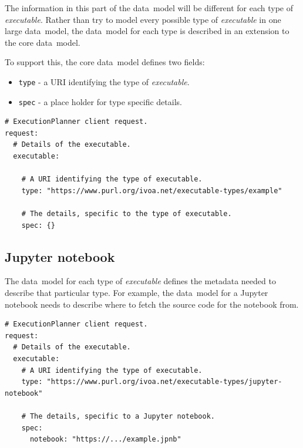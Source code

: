 \documentclass[11pt,a4paper]{ivoa}
\newcommand{\datamodel} {data~model}
\newcommand{\jupyternotebook} {Jupyter notebook}
\newcommand{\codeword}[1] {\texttt{#1}}
\newcommand{\executable} {\textit{executable}}
\begin{document}
The information in this part of the \datamodel{} will be different for each type of \executable{}.
Rather than try to model every possible type of \executable{} in one large \datamodel{},
the \datamodel{} for each type is described in an extension to the core \datamodel{}.

To support this, the core \datamodel{} defines two fields:
\begin{itemize}
  \item \codeword{type} - a URI identifying the type of \executable{}.
  \item \codeword{spec} - a place holder for type specific details.
\end{itemize}

\begin{lstlisting}[]
# ExecutionPlanner client request.
request:
  # Details of the executable.
  executable:

    # A URI identifying the type of executable.
    type: "https://www.purl.org/ivoa.net/executable-types/example"

    # The details, specific to the type of executable.
    spec: {}
\end{lstlisting}

\subsection{\jupyternotebook{}}
\label{jupyternotebook}
The \datamodel{} for each type of \executable{} defines the metadata needed to
describe that particular type.
For example, the \datamodel{} for a \jupyternotebook{} needs to describe where
to fetch the source code for the notebook from.

\begin{lstlisting}[]
# ExecutionPlanner client request.
request:
  # Details of the executable.
  executable:
    # A URI identifying the type of executable.
    type: "https://www.purl.org/ivoa.net/executable-types/jupyter-notebook"

    # The details, specific to a Jupyter notebook.
    spec:
      notebook: "https://.../example.jpnb"
\end{lstlisting}
\end{document}
